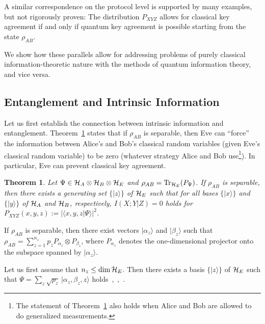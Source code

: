\documentclass{article}
\newtheorem{theo}{Theorem}
\newcommand{\Tr}{{\rm Tr}}
\newcommand{\HA}{{\cal H}_{{A}}}
\newcommand{\HB}{{\cal H}_{{B}}}
\newcommand{\HE}{{\cal H}_{{E}}}
\newcommand{\noi}{\noindent}
\begin{document}
A similar  correspondence on the protocol level is supported 
by many examples, but not  rigorously proven:
The distribution $P_{XYZ}$ allows for classical key agreement if and 
only if quantum key agreement is possible starting from the state $\rho_{AB}$.

We show how these parallels allow for addressing problems
of purely classical information-theoretic nature 
with the methods of quantum information theory, and vice versa.



\subsection{Entanglement and Intrinsic Information}
\label{linkingone}

Let us first establish the connection between intrinsic information
and entanglement.   Theorem~\ref{theoeins} states  that if 
 $\rho_{AB}$ is separable, then Eve can ``force'' the  information
between
   Alice's and Bob's classical random variables (given Eve's classical random variable) 
to be zero (whatever strategy Alice and Bob use\footnote{The statement of 
Theorem~\ref{theoeins} also holds when Alice and Bob are allowed to do 
generalized measurements.}). 
   In particular, Eve can prevent classical key agreement. 



\begin{theo}\label{theoeins}
Let $\Psi\in\HA\otimes\HB\otimes\HE$ and $\rho_{AB}=\Tr_{\HE}(P_{\Psi})$.
If $\rho_{AB}$ is separable,
then there exists a generating set $\{|z\rangle\} $ of $\HE$  such that
for all bases $\{|x\rangle\} $ and $\{|y\rangle\} $ of $\HA$ and $\HB$,
respectively,
$I(X;Y|Z)=0$
holds for 
 $P_{XYZ}(x,y,z):=|\langle x,y,z|\Psi\rangle |^2$.
\end{theo}


\noi
\proof
If $\rho_{AB}$ is separable, then there exist vectors $|\alpha_z\rangle$ and
$|\beta_z\rangle$
such that
$
\rho_{AB}=\sum_{z=1}^{n_z} p_z
P_{\alpha_z}\otimes P_{\beta_z}
$,
where $P_{\alpha_z}$ denotes the one-dimensional projector onto the subspace spanned
by $|\alpha_z\rangle$.

Let us first assume that $n_z\le \dim\HE$.
Then there exists a basis $\{|z\rangle\}$ of $\HE$ such that 
$
\Psi=\sum_z \sqrt{p_z}\, |\alpha_z,\beta_z,z\rangle 
$
holds~\cite{qp9609013},\, 
\cite{gisin89},\, \cite{hjw93}.
\end{document}
